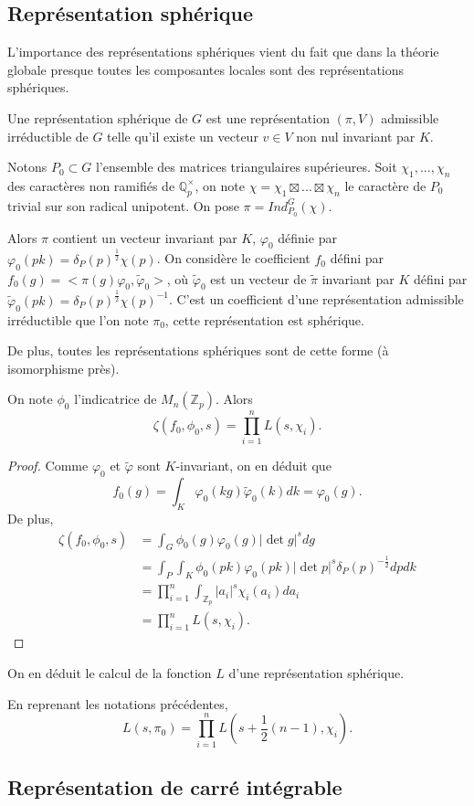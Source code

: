 \subsection{Représentation sphérique}

L'importance des représentations sphériques vient du fait que dans la théorie globale presque toutes les composantes locales sont des représentations sphériques.

\begin{definition}
Une représentation sphérique de $G$ est une représentation $(\pi, V)$ admissible irréductible de $G$ telle qu'il existe un vecteur $v \in V$ non nul invariant par $K$.
\end{definition}

Notons $P_0 \subset G$ l'ensemble des matrices triangulaires supérieures. Soit $\chi_1, ..., \chi_n$ des caractères non ramifiés de $\mathbb{Q}_p^\times$, on note $\chi = \chi_1 \boxtimes ... \boxtimes \chi_n$ le caractère de $P_0$ trivial sur son radical unipotent. On pose $\pi = Ind_{P_0}^G(\chi)$.

Alors $\pi$ contient un vecteur invariant par $K$, $\varphi_0$ définie par $\varphi_0(pk)=\delta_P(p)^{\frac{1}{2}}\chi(p)$. On considère le coefficient $f_0$ défini par $f_0(g)=<\pi(g)\varphi_0, \tilde{\varphi}_0>$, où $\tilde{\varphi}_0$ est un vecteur de $\tilde{\pi}$ invariant par $K$ défini par $\tilde{\varphi}_0(pk)=\delta_P(p)^{\frac{1}{2}}\chi(p)^{-1}$. C'est un coefficient d'une représentation admissible irréductible que l'on note $\pi_0$, cette représentation est sphérique.

De plus, toutes les représentations sphériques sont de cette forme (à isomorphisme près).

\begin{lemme}
On note $\phi_0$ l'indicatrice de $M_n(\mathbb{Z}_p)$. Alors
\begin{equation}
\zeta(f_0, \phi_0, s) = \prod_{i=1}^n L(s, \chi_i).
\end{equation}
\end{lemme}

\begin{proof}
Comme $\varphi_0$ et $\tilde{\varphi}$ sont $K$-invariant, on en déduit que
\begin{equation}
f_0(g)=\int_K \varphi_0(kg)\tilde{\varphi}_0(k)dk=\varphi_0(g).
\end{equation}
De plus,
\begin{align}
\zeta(f_0, \phi_0, s) &= \int_G \phi_0(g)\varphi_0(g)|\det g|^s dg \\
&= \int_P \int_K \phi_0(pk) \varphi_0(pk) |\det p|^s \delta_P(p)^{-\frac{1}{2}}dp dk \\
&= \prod_{i=1}^n \int_{\mathbb{Z}_p}|a_i|^s\chi_i(a_i)da_i \\
&= \prod_{i=1}^n L(s, \chi_i).
\end{align}
\end{proof}

On en déduit le calcul de la fonction $L$ d'une représentation sphérique.
\begin{proposition}
En reprenant les notations précédentes,
\begin{equation}
L(s, \pi_0) = \prod_{i=1}^n L(s+\frac{1}{2}(n-1), \chi_i).
\end{equation}
\end{proposition}
\subsection{Représentation de carré intégrable}